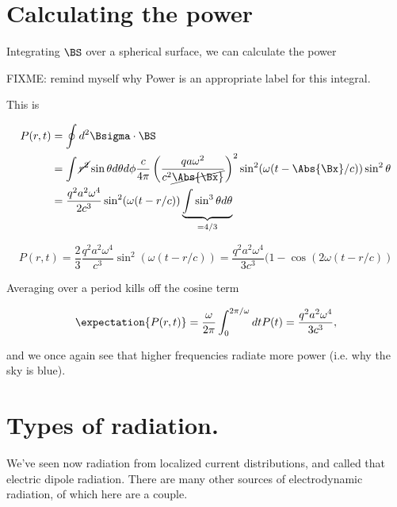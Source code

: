 \section{Calculating the power}

Integrating $\BS$ over a spherical surface, we can calculate the power

FIXME: remind myself why Power is an appropriate label for this integral.

This is

\begin{align*}
P(r, t)
&= \oint d^2 \Bsigma \cdot \BS \\
&= \int \cancel{r^2} \sin\theta d\theta d\phi 
\frac{c}{4 \pi}
\left( \frac{q a \omega^2}{c^2 \cancel{\Abs{\Bx}} } \right)^2
\sin^2(\omega (t - \Abs{\Bx}/c)) \sin^2\theta \\
&=
\frac{q^2 a^2 \omega^4}{2 c^3 }
\sin^2(\omega (t - r/c))
\underbrace{\int \sin^3\theta d\theta}_{=4/3}
\end{align*}

\begin{equation}\label{eqn:relativisticElectrodynamicsL21:220}
P(r, t) = \frac{2}{3} \frac{q^2 a^2 \omega^4}{c^3} \sin^2(\omega (t - r/c)) =
\frac{q^2 a^2 \omega^4}{3 c^3} (1 - \cos(2 \omega (t - r/c))
\end{equation}

Averaging over a period kills off the cosine term

\begin{equation}\label{eqn:relativisticElectrodynamicsL21:240}
\expectation{P(r, t)} = \frac{\omega}{2 \pi} \int_0^{2 \pi/\omega} dt P(t) = \frac{q^2 a^2 \omega^4}{3 c^3},
\end{equation}

and we once again see that higher frequencies radiate more power (i.e. why the sky is blue).

\section{Types of radiation.}

We've seen now radiation from localized current distributions, and called that electric dipole radiation.  There are many other sources of electrodynamic radiation, of which here are a couple.

